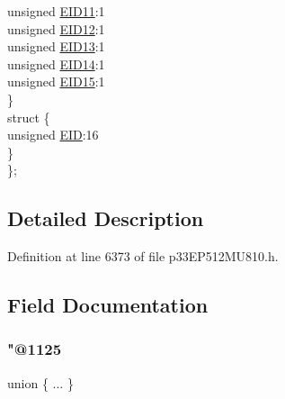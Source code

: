 \begin{DoxyCompactItemize}
\begin{tabbing}
\>\>unsigned \hyperlink{structtag_c2_r_x_f3_e_i_d_b_i_t_s_a710bdb0d602deb021b0be99066008018}{EID11}:1\\
\>\>unsigned \hyperlink{structtag_c2_r_x_f3_e_i_d_b_i_t_s_aa347bb85867bd8d4e0124f7cff8c6472}{EID12}:1\\
\>\>unsigned \hyperlink{structtag_c2_r_x_f3_e_i_d_b_i_t_s_a37d5f3edcbf6ef62f848fd4f3c584f79}{EID13}:1\\
\>\>unsigned \hyperlink{structtag_c2_r_x_f3_e_i_d_b_i_t_s_a7ffc0b0e0d99b8476b6f9a45337c17ab}{EID14}:1\\
\>\>unsigned \hyperlink{structtag_c2_r_x_f3_e_i_d_b_i_t_s_a293cd7dc1746257fa75a60cbd9383cd7}{EID15}:1\\
\>\} \\
\>struct \{\\
\>\>unsigned \hyperlink{structtag_c2_r_x_f3_e_i_d_b_i_t_s_ae80b378c9141f7c03e0b4e55b5f4b54d}{EID}:16\\
\>\} \\
\}; \\

\end{tabbing}\end{DoxyCompactItemize}


\subsection{Detailed Description}


Definition at line 6373 of file p33\+E\+P512\+M\+U810.\+h.



\subsection{Field Documentation}
\mbox{\label{structtag_c2_r_x_f3_e_i_d_b_i_t_s_a500fff310a23e713e0ec3abcce10b6e7}} 
\subsubsection{\texorpdfstring{"@1125}{@1125}}
{\footnotesize\ttfamily union \{ ... \} }

\mbox{\label{structtag_c2_r_x_f3_e_i_d_b_i_t_s_ae80b378c9141f7c03e0b4e55b5f4b54d}} 
